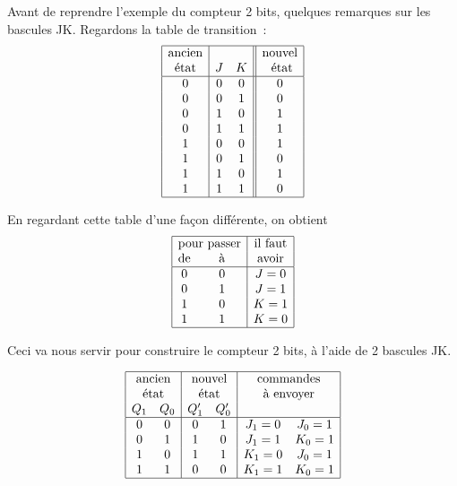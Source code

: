 Avant de reprendre l'exemple du compteur 2 bits, quelques remarques
sur les bascules JK. Regardons la table de transition~:
$$ \begin{array}{|c|cc||c|}
\hline 
\mbox{ancien}	&  &  & \mbox{nouvel} \\
\mbox{\'etat}	& J & K & \mbox{ \'etat} \\
\hline
	0 &	0 &  0 &	0 \\
	0 &	0 &  1 &	0 \\
	0 &	1 &  0 &	1 \\
	0 &	1 &  1 &	1 \\
	1 &	0 &  0 &	1 \\
	1 &	0 &  1 &	0 \\
	1 &	1 &  0 &	1 \\
	1 &	1 &  1 &	0 \\
\hline	
\end{array} $$

En regardant cette table d'une fa\c{c}on diff\'erente, on obtient
$$ \begin{array}{|cc|c|}
\hline 
\multicolumn{2}{|c|}{\mbox{pour passer}} &
\mbox{il faut} \\
\mbox{de} & \mbox{\`a} & \mbox{avoir} \\
\hline
	0 &	0 &	J=0 \\
	0 &	1 &	J=1 \\
	1 &	0 &	K=1 \\
	1 &	1 &	K=0 \\
\hline
\end{array} $$

Ceci va nous servir pour construire le compteur 2 bits, \`a l'aide de 2
bascules JK.

$$
\begin{array}{|cc|cc|cc|}
\hline
\multicolumn{2}{|c|}{\mbox{ancien}} &
\multicolumn{2}{c|}{\mbox{nouvel}} &
\multicolumn{2}{c|}{\mbox{commandes}}  \\
\multicolumn{2}{|c|}{\mbox{\'etat}} &
\multicolumn{2}{c|}{\mbox{\'etat}} &
\multicolumn{2}{c|}{\mbox{\`a envoyer}} \\
	Q_1 &Q_0&	Q'_1& Q'_0& & \\	
\hline
	0&  0&	0&   1&	J_1=0 &J_0=1 \\
	0&  1&	1&   0&	J_1=1 &K_0=1  \\
	1&  0&    1&   1&	K_1=0 &J_0=1  \\
	1&  1&	0&   0&	K_1=1& K_0=1  \\
\hline
\end{array} $$

